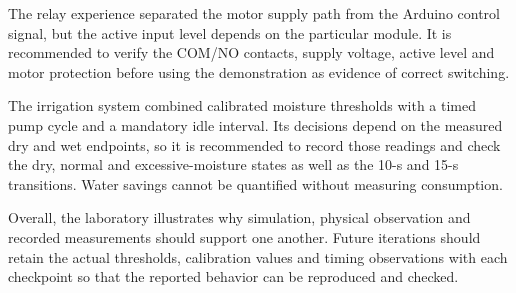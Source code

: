 The relay experience separated the motor supply path from the Arduino control
signal, but the active input level depends on the particular module. It is
recommended to verify the COM/NO contacts, supply voltage, active level and
motor protection before using the demonstration as evidence of correct
switching.

The irrigation system combined calibrated moisture thresholds with a timed
pump cycle and a mandatory idle interval. Its decisions depend on the measured
dry and wet endpoints, so it is recommended to record those readings and check
the dry, normal and excessive-moisture states as well as the 10-s and 15-s
transitions. Water savings cannot be quantified without measuring consumption.

Overall, the laboratory illustrates why simulation, physical observation and
recorded measurements should support one another. Future iterations should
retain the actual thresholds, calibration values and timing observations with
each checkpoint so that the reported behavior can be reproduced and checked.
